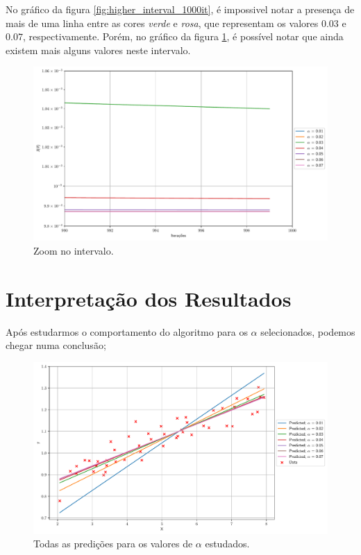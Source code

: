 \documentclass[a4paper, 12pt]{article}
\begin{document}
No gráfico da figura \ref{fig:higher_interval_1000it}, é impossivel notar a presença de mais de uma linha entre
as cores \textit{verde} e \textit{rosa}, que representam os valores $0.03$ e $0.07$, respectivamente. Porém, no 
gráfico da figura \ref{fig:max_zoom}, é possível notar que ainda existem mais alguns valores neste intervalo.

\begin{figure}[!h]
    \centering
    \includegraphics[width=1\textwidth]{../imgs/max_zoom.pdf}
    \caption{Zoom no intervalo.}
    \label{fig:max_zoom}
\end{figure}

\section{Interpretação dos Resultados}
Após estudarmos o comportamento do algoritmo para os $\alpha$ selecionados, podemos chegar numa conclusão; 

\begin{figure}[!h]
    \centering
    \includegraphics[width=1\textwidth]{../imgs/all_predictions.pdf}
    \caption{Todas as predições para os valores de $\alpha$ estudados.}
    \label{fig:all_predictions}
\end{figure}
\end{document}
